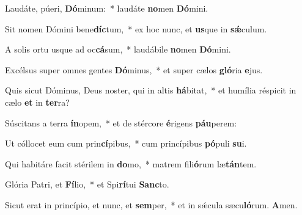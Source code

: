 \item Laudáte, púeri, \textbf{Dó}minum:~* laudáte \textbf{no}men \textbf{Dó}mini.

\item {} Sit nomen Dómini bene\textbf{díc}tum,~* ex hoc nunc, et \textbf{us}que in \textbf{sǽ}culum.

\item A solis ortu usque ad oc\textbf{cá}sum,~* laudábile \textbf{no}men \textbf{Dó}mini.

\item Excélsus super omnes gentes \textbf{Dó}minus,~* et super cælos \textbf{gló}ria \textbf{e}jus.

\item Quis sicut Dóminus, Deus noster, qui in altis \textbf{há}bitat,~* et humília réspicit in cælo \textbf{et} in \textbf{ter}ra?

\item Súscitans a terra \textbf{ín}opem,~* et de stércore \textbf{é}rigens \textbf{páu}perem:

\item Ut cóllocet eum cum prin\textbf{cí}pibus,~* cum princípibus \textbf{pó}puli \textbf{su}i.

\item Qui habitáre facit stérilem in \textbf{do}mo,~* matrem fili\textbf{ó}rum læ\textbf{tán}tem.

\item Glória Patri, et \textbf{Fí}lio,~* et Spi\textbf{rí}tui \textbf{Sanc}to.

\item Sicut erat in princípio, et nunc, et \textbf{sem}per,~* et in sǽcula sæcu\textbf{ló}rum. \textbf{A}men.
